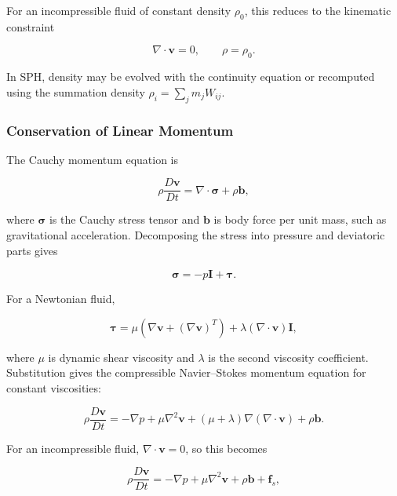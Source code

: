 \documentclass[11pt]{article}
\begin{document}
For an incompressible fluid of constant density $\rho_0$, this reduces to the
kinematic constraint

\begin{equation}
    \nabla\cdot\mathbf{v}=0,
    \qquad \rho=\rho_0.
\end{equation}

In SPH, density may be evolved with the continuity equation or recomputed using
the summation density $\rho_i=\sum_j m_jW_{ij}$.

\subsubsection{Conservation of Linear Momentum}

The Cauchy momentum equation is

\begin{equation}
    \rho\frac{D\mathbf{v}}{Dt}
    = \nabla\cdot\boldsymbol{\sigma}
    + \rho\mathbf{b},
\end{equation}

where $\boldsymbol{\sigma}$ is the Cauchy stress tensor and $\mathbf{b}$ is
body force per unit mass, such as gravitational acceleration. Decomposing the
stress into pressure and deviatoric parts gives

\begin{equation}
    \boldsymbol{\sigma}=-p\mathbf{I}+\boldsymbol{\tau}.
\end{equation}

For a Newtonian fluid,

\begin{equation}
    \boldsymbol{\tau}
    = \mu\left(\nabla\mathbf{v}
    +(\nabla\mathbf{v})^{T}\right)
    +\lambda(\nabla\cdot\mathbf{v})\mathbf{I},
\end{equation}

where $\mu$ is dynamic shear viscosity and $\lambda$ is the second viscosity
coefficient. Substitution gives the compressible Navier--Stokes momentum
equation for constant viscosities:

\begin{equation}
    \rho\frac{D\mathbf{v}}{Dt}
    =-\nabla p
    +\mu\nabla^2\mathbf{v}
    +(\mu+\lambda)\nabla(\nabla\cdot\mathbf{v})
    +\rho\mathbf{b}.
\end{equation}

For an incompressible fluid, $\nabla\cdot\mathbf{v}=0$, so this becomes

\begin{equation}
    \rho \frac{D\mathbf{v}}{Dt}
    = -\nabla p + \mu \nabla^2 \mathbf{v}
    + \rho\mathbf{b}+\mathbf{f}_{s},
\end{equation}
\end{document}
